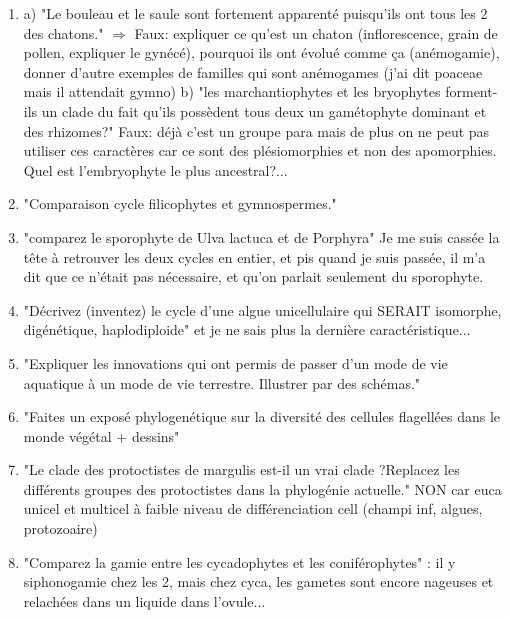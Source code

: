 \begin{enumerate}
	\item a) "Le bouleau et le saule sont fortement apparenté puisqu'ils ont tous les 2 des chatons." $\Rightarrow$  Faux: expliquer ce qu'est un chaton (inflorescence, grain de pollen, expliquer le gynécé), pourquoi ils ont évolué comme ça (anémogamie), donner d'autre exemples de familles qui sont anémogames (j'ai dit poaceae mais il attendait gymno)
b) "les marchantiophytes et les bryophytes forment-ils un clade du fait qu'ils possèdent tous deux un gamétophyte dominant et des rhizomes?" Faux: déjà c'est un groupe para mais de plus on ne peut pas utiliser ces caractères car ce sont des plésiomorphies et non des apomorphies. Quel est l'embryophyte le plus ancestral?...

	\item "Comparaison cycle filicophytes et gymnospermes."

	\item "comparez le sporophyte de Ulva lactuca et de Porphyra" 
Je me suis cassée la tête à retrouver les deux cycles en entier, et pis quand je suis passée, il m’a dit que ce n'était pas nécessaire, et qu'on parlait seulement du sporophyte.

	\item "Décrivez (inventez) le cycle d'une algue unicellulaire qui SERAIT  isomorphe,
digénétique, haplodiploide" et je ne sais plus la dernière caractéristique...

	\item "Expliquer les innovations qui ont permis de passer d'un mode de vie aquatique à un mode de vie terrestre. Illustrer par des schémas."

	\item "Faites un exposé phylogenétique sur la diversité des cellules flagellées dans le monde végétal + dessins"

	\item "Le clade des protoctistes de margulis est-il un vrai clade ?Replacez les différents groupes des protoctistes dans la phylogénie actuelle." NON car euca unicel et multicel à faible niveau de différenciation cell (champi inf, algues, protozoaire)

	\item "Comparez la gamie entre les cycadophytes et les coniférophytes" : il y siphonogamie chez les 2, mais chez cyca, les gametes sont encore nageuses et relachées dans un liquide dans l'ovule...


\end{enumerate}
